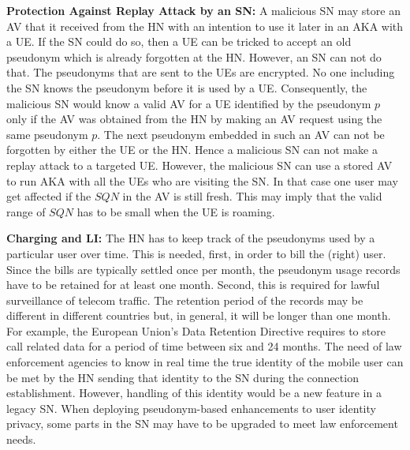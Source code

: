 \documentclass{llncs} %
\begin{document}
\textbf{Protection Against Replay Attack by an SN:} A malicious SN may store an AV that it received from the HN with an intention to use it later in an AKA with a UE. If the SN could do so, then a UE can be tricked to accept an old pseudonym which is already forgotten at the HN. However, an SN can not do that. The pseudonyms that are sent to the UEs are encrypted. No one including the SN knows the pseudonym before it is used by a UE. Consequently, the malicious SN would know a valid AV for a UE identified by the pseudonym $p$ only if the AV was obtained from the HN by making an AV request using the same pseudonym $p$. The next pseudonym embedded in such an AV can not be forgotten by either the UE or the HN. Hence a malicious SN can not make a replay attack to a targeted UE. However, the malicious SN can use a stored AV to run AKA with all the UEs who are visiting the SN. In that case one user may get affected if the $SQN$ in the AV is still fresh. This may imply that the valid range of $SQN$ has to be small when the UE is roaming.



\textbf{Charging and LI:} The HN has to keep track of the pseudonyms used by a particular user over time. This is needed, first, in order to bill the (right) user. Since the bills are typically settled once per month, the pseudonym usage records have to be retained for at least one month. Second, this is required for lawful surveillance of telecom traffic. The retention period of the records may be different in different countries but, in general, it will be longer than one month. For example, the European Union's Data Retention Directive \cite{dataretention} requires to store call related data for a period of time between six and 24 months. The need of law enforcement agencies to know in real time the true identity of the mobile user can be met by the HN sending that identity to the SN during the connection establishment. However, handling of this identity would be a new feature in a legacy SN. When deploying pseudonym-based enhancements to user identity privacy, some parts in the SN may have to be upgraded to meet law enforcement needs.
\end{document}
